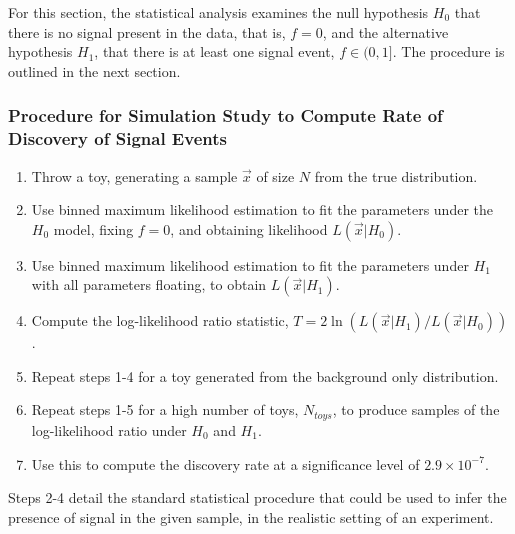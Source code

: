 \documentclass[12pt]{article}
\begin{document}
For this section, the statistical analysis examines the null hypothesis $H_0$ that there is no signal present in the data, that is, $f=0$, and the alternative hypothesis $H_1$, that there is at least one signal event, $f\in(0,1]$.
The procedure is outlined in the next section.
\subsubsection*{Procedure for Simulation Study to Compute Rate of Discovery of Signal Events}
\begin{enumerate}
    \item Throw a toy, generating a sample $\vec{x}$ of size $N$ from the true distribution.
    \item Use binned maximum likelihood estimation to fit the parameters under the $H_0$ model, fixing $f=0$, and obtaining likelihood $L(\vec{x}|H_0)$.
    \item Use binned maximum likelihood estimation to fit the parameters under $H_1$ with all parameters floating, to obtain $L(\vec{x}|H_1)$.
    \item Compute the log-likelihood ratio statistic, $T = 2\ln(L(\vec{x}|H_1)/L(\vec{x}|H_0))$.
    \item Repeat steps 1-4 for a toy generated from the background only distribution.
    \item Repeat steps 1-5 for a high number of toys, $N_{toys}$, to produce samples of the log-likelihood ratio under $H_0$ and $H_1$.
    \item Use this to compute the discovery rate at a significance level of $2.9\times10^{-7}$.
\end{enumerate}
Steps 2-4 detail the standard statistical procedure that could be used to infer the presence of signal in the given sample, in the realistic setting of an experiment.
\end{document}

